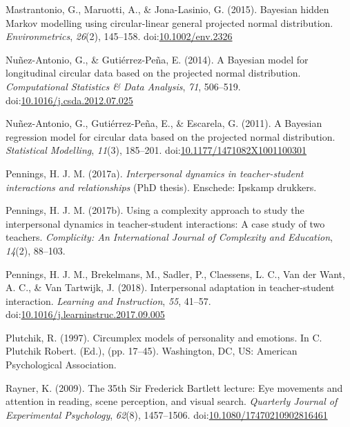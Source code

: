 \documentclass[man,mask]{apa6}
\DeclareRobustCommand{\VANDER}[3]{#2}
\DeclareRobustCommand{\VAN}[3]{#2}
\begin{document}
\leavevmode\hypertarget{ref-mastrantonio2015bayesian}{}%
Mastrantonio, G., Maruotti, A., \& Jona-Lasinio, G. (2015). Bayesian hidden Markov modelling using circular-linear general projected normal distribution. \emph{Environmetrics}, \emph{26}(2), 145--158. doi:\href{https://doi.org/10.1002/env.2326}{10.1002/env.2326}

\leavevmode\hypertarget{ref-nunez2014bayesian}{}%
Nuñez-Antonio, G., \& Gutiérrez-Peña, E. (2014). A Bayesian model for longitudinal circular data based on the projected normal distribution. \emph{Computational Statistics \& Data Analysis}, \emph{71}, 506--519. doi:\href{https://doi.org/10.1016/j.csda.2012.07.025}{10.1016/j.csda.2012.07.025}

\leavevmode\hypertarget{ref-nunez2011bayesian}{}%
Nuñez-Antonio, G., Gutiérrez-Peña, E., \& Escarela, G. (2011). A Bayesian regression model for circular data based on the projected normal distribution. \emph{Statistical Modelling}, \emph{11}(3), 185--201. doi:\href{https://doi.org/10.1177/1471082X1001100301}{10.1177/1471082X1001100301}

\leavevmode\hypertarget{ref-pennings2017phd}{}%
Pennings, H. J. M. (2017a). \emph{Interpersonal dynamics in teacher-student interactions and relationships} (PhD thesis). Enschede: Ipskamp drukkers.

\leavevmode\hypertarget{ref-pennings2017complexity}{}%
Pennings, H. J. M. (2017b). Using a complexity approach to study the interpersonal dynamics in teacher-student interactions: A case study of two teachers. \emph{Complicity: An International Journal of Complexity and Education}, \emph{14}(2), 88--103.

\leavevmode\hypertarget{ref-pennings2018interpersonal}{}%
Pennings, H. J. M., Brekelmans, M., Sadler, P., Claessens, L. C., \VANDER{Want}{Van der}{van der} Want, A. C., \& \VAN{Tartwijk}{Van}{van} Tartwijk, J. (2018). Interpersonal adaptation in teacher-student interaction. \emph{Learning and Instruction}, \emph{55}, 41--57. doi:\href{https://doi.org/10.1016/j.learninstruc.2017.09.005}{10.1016/j.learninstruc.2017.09.005}

\leavevmode\hypertarget{ref-plutchik1997general}{}%
Plutchik, R. (1997). Circumplex models of personality and emotions. In C. Plutchik Robert. (Ed.), (pp. 17--45). Washington, DC, US: American Psychological Association.

\leavevmode\hypertarget{ref-rayner200935th}{}%
Rayner, K. (2009). The 35th Sir Frederick Bartlett lecture: Eye movements and attention in reading, scene perception, and visual search. \emph{Quarterly Journal of Experimental Psychology}, \emph{62}(8), 1457--1506. doi:\href{https://doi.org/10.1080/17470210902816461}{10.1080/17470210902816461}
\end{document}
